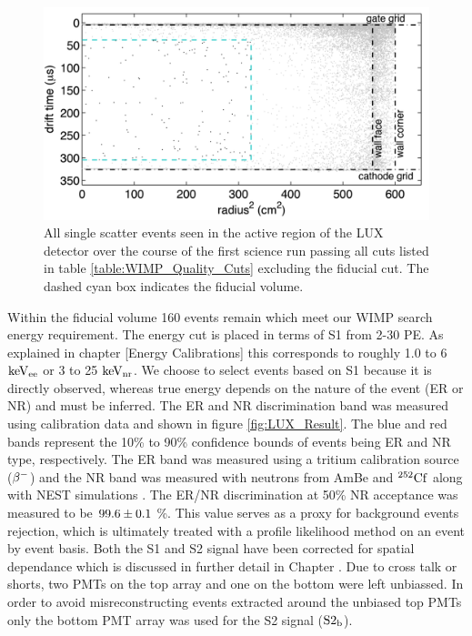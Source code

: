  \begin{figure}[h!]\centering
\includegraphics[width=130mm]{Chapter_LUX_Det/LUX_Result_Event.png}
\caption{All single scatter events seen in the active region of the LUX detector over the course of the first science run passing all cuts listed in table \ref{table:WIMP_Quality_Cuts} excluding the fiducial cut. The dashed cyan box indicates the fiducial volume.}
\label{fig:LUX_Result_Event}
\end{figure}

Within the fiducial volume 160 events remain which meet our WIMP search energy requirement. The energy cut is placed in terms of S1 from 2-30 PE. As explained in chapter [Energy Calibrations] this corresponds to roughly 1.0 to 6 $\rm keV_{ee}$ or 3 to 25 $\rm keV_{nr}$. We choose to select events based on S1 because it is directly observed, whereas true energy depends on the nature of the event (ER or NR) and must be inferred. %
The ER and NR discrimination band was measured using calibration data and shown in figure \ref{fig:LUX_Result}. The blue and red bands represent the 10\% to 90\% confidence bounds of events being ER and NR type, respectively. The ER band was measured using a tritium calibration source ($\rm \beta^{-}$) and the NR band was measured with neutrons from AmBe and $\rm^{252}Cf$ along with NEST simulations \cite{NEST_2013}. The ER/NR discrimination at 50\% NR acceptance was measured to be $\rm 99.6\pm0.1$ \%. This value serves as a proxy for background events rejection, which is ultimately treated with a profile likelihood method on an event by event basis. Both the S1 and S2 signal have been corrected for spatial dependance which is discussed in further detail in Chapter \label{Ch:3}. Due to cross talk or shorts, two PMTs on the top array and one on the bottom were left unbiassed.  In order to avoid misreconstructing events extracted around the unbiased top PMTs only the bottom PMT array was used for the S2 signal ($\rm S2_b$).


